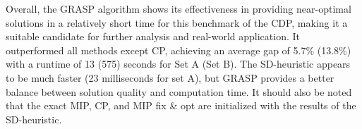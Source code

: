 \documentclass{article}
\begin{document}
\begin{table}[htbp]
    \centering
    \caption{Performance of the GRASP heuristic on the CDP benchmark instances}
    \label{tab:cdp_lit_comp}
    \scriptsize
\end{table}

Overall, the GRASP algorithm shows its effectiveness in providing near-optimal solutions in a relatively short time for this benchmark of the CDP, making it a suitable candidate for further analysis and real-world application.  It outperformed all methods except CP, achieving an average gap of 5.7\% (13.8\%) with a runtime of 13 (575) seconds for Set A (Set B). The SD-heuristic appears to be much faster (23 milliseconds for set A), but GRASP provides a better balance between solution quality and computation time. It should also be noted that the exact MIP, CP, and MIP fix \& opt are initialized with the results of the SD-heuristic.
\end{document}

